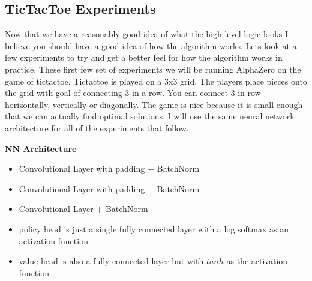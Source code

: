 \begin{algorithm}[H]
\SetAlgoLined
{}
\end{algorithm}


\subsection{TicTacToe Experiments}

Now that we have a reasonably good idea of what the high level logic looks I believe you should have a good idea of how the algorithm works. Lets look at a few experiments to try and get a better feel for how the algorithm works in practice. These first few set of experiments we will be running AlphaZero on the game of tictactoe. Tictactoe is played on a 3x3 grid. The players place pieces onto the grid with goal of connecting 3 in a row. You can connect 3 in row horizontally, vertically or diagonally. The game is nice because it is small enough that we can actually find optimal solutions. I will use the same neural network architecture for all of the experiments that follow. 

\textbf{NN Architecture}
\begin{itemize}
    \item Convolutional Layer with padding + BatchNorm
    \item Convolutional Layer with padding + BatchNorm
    \item Convolutional Layer + BatchNorm
    \item policy head is just a single fully connected layer with a log softmax as an activation function
    \item value head is also a fully connected layer but with $tanh$ as the activation function
\end{itemize}

